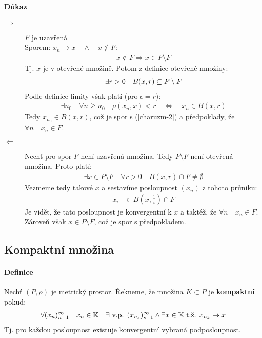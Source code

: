 \documentclass[a4paper,10pt]{article}
\begin{document}
\paragraph{Důkaz}
\begin{description}
	\item[$\Rightarrow$] $F$ je uzavřená\\%
	Sporem: $x_n\to x \quad \land \quad  x \nin F$:
	\begin{align}
		x \nin F \Rightarrow
		x \in P \setminus F
	\end{align}
	Tj. $x$ je v otevřené množině. Potom z definice otevřené množiny:
	\begin{align}
		\label{charuzm-2} \exists r> 0 \quad B(x,r) \subseteq P \setminus F
	\end{align}
	Podle definice limity však platí (pro $\epsilon = r$):
	\begin{align}
		\exists n_0 \quad \forall n \ge n_0 \quad \rho(x_n, x) < r
		\quad \Leftrightarrow \quad x_n \in B(x,r)
	\end{align}
	Tedy $x_{n_0} \in B(x,r)$, což je spor s
	(\ref{charuzm-2}) a předpoklady, že $\forall n \quad x_n \in F$.

	\item[$\Leftarrow$]
	Nechť pro spor $F$ není uzavřená množina. Tedy $P \setminus F$ není otevřená
	množina. Proto platí:
	\begin{align}
		\exists x \in P\setminus F \quad \forall r > 0 \quad B(x,r) \cap F \neq
		\emptyset
	\end{align}
	Vezmeme tedy takové $x$ a sestavíme posloupnost $(x_n)$ z tohoto průniku:
	\begin{align}
		x_i &\in B(x,\frac{1}{i}) \cap F
	\end{align}
	Je vidět,  že tato posloupnost je konvergentní k $x$ a taktéž, že $\forall n
	\quad x_n \in F$. Zároveň však $x \in P\setminus F$, což je spor s
	předpokladem.
\end{description}


\subsection{Kompaktní množina}
\setcounter{equation}{0}
\paragraph{Definice}
Nechť $(P, \rho)$ je metrický prostor. Řekneme, že množina $K \subset P$ je
\textbf{kompaktní} pokud:
\begin{align*}
	\forall (x_n)_{n=1}^\infty \quad x_n \in \mathbb{K} \quad \exists \text{ v.p. }
	(x_{n_s})_{s=1}^\infty \land \exists x \in \mathbb{K} \text{ t.ž. } x_{n_k}\to x
\end{align*}
Tj. pro každou posloupnost existuje konvergentní vybraná podposloupnost.
\end{document}
